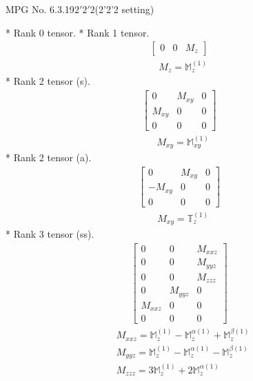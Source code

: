 \documentclass[fleqn,8pt,landscape]{jsarticle}
\begin{document}
\setcounter{MaxMatrixCols}{32}

\renewcommand{\tablename}{Table~}
\renewcommand{\figurename}{Figure~}
\begin{center}
\LARGE
MPG No. 6.3.19\quad$2'2'2$\quad(2'2'2 setting)
\end{center}
* Rank 0 tensor.
* Rank 1 tensor.
\begin{align*}
\begin{bmatrix} 0 & 0 & M_{z} \end{bmatrix}
\end{align*}
\begin{align*}
& M_{z} = \mathbb{M}_{z}^{(1)}
\end{align*}
* Rank 2 tensor (s).
\begin{align*}
\begin{bmatrix} 0 & M_{xy} & 0 \\ M_{xy} & 0 & 0 \\ 0 & 0 & 0 \end{bmatrix}
\end{align*}
\begin{align*}
& M_{xy} = \mathbb{M}_{xy}^{(1)}
\end{align*}
* Rank 2 tensor (a).
\begin{align*}
\begin{bmatrix} 0 & M_{xy} & 0 \\ - M_{xy} & 0 & 0 \\ 0 & 0 & 0 \end{bmatrix}
\end{align*}
\begin{align*}
& M_{xy} = \mathbb{T}_{z}^{(1)}
\end{align*}
* Rank 3 tensor (ss).
\begin{align*}
\begin{bmatrix} 0 & 0 & M_{xxz} \\ 0 & 0 & M_{yyz} \\ 0 & 0 & M_{zzz} \\ 0 & M_{yyz} & 0 \\ M_{xxz} & 0 & 0 \\ 0 & 0 & 0 \end{bmatrix}
\end{align*}
\begin{align*}
& M_{xxz} = \mathbb{M}_{z}^{(1)} - \mathbb{M}_{z}^{\alpha(1)} + \mathbb{M}_{z}^{\beta(1)} \\
& M_{yyz} = \mathbb{M}_{z}^{(1)} - \mathbb{M}_{z}^{\alpha(1)} - \mathbb{M}_{z}^{\beta(1)} \\
& M_{zzz} = 3 \mathbb{M}_{z}^{(1)} + 2 \mathbb{M}_{z}^{\alpha(1)}
\end{align*}
\end{document}
